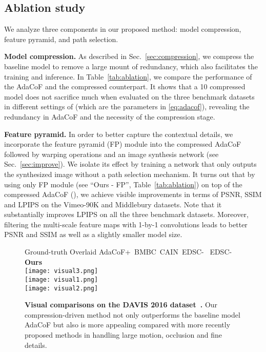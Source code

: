 \documentclass[final]{cvpr}
\newcommand{\myparagraph}[1]{\textbf{#1}}
\begin{document}
\subsection{Ablation study}

We analyze three components in our proposed method: model compression, feature pyramid, and path selection. 

\myparagraph{Model compression.} As described in Sec.~\ref{sec:compression}, we compress the baseline model to remove a large mount of redundancy, which also facilitates the training and inference. In Table~\ref{tab:ablation}, we compare the performance of the AdaCoF and the compressed counterpart. It shows that a 10 compressed model does not sacrifice much when evaluated on the three benchmark datasets in different settings of  (which are the parameters in \eqref{eq:adacof}), revealing the redundancy in AdaCoF and the necessity of the compression stage.


\myparagraph{Feature pyramid.} In order to better capture the contextual details, we incorporate the feature pyramid (FP) module into the compressed AdaCoF followed by warping operations and an image synthesis network (see Sec.~\ref{sec:improve}). We isolate its effect by training a network that only outputs the synthesized image without a path selection mechanism. It turns out that by using only FP module (see ``Ours - FP'', Table~\ref{tab:ablation}) on top of the compressed AdaCoF (), we achieve visible improvements in terms of PSNR, SSIM and LPIPS on the Vimeo-90K and Middlebury datasets. Note that it substantially improves LPIPS on all the three benchmark datasets. Moreover, filtering the multi-scale feature maps with 1-by-1 convolutions leads to better PSNR and SSIM as well as a slightly smaller model size.

\begin{figure*}[!ht]
\vspace{-.2in}
{\footnotesize \hspace{0.85in}Ground-truth\hspace{0.9in} Overlaid \hspace{0.12in}AdaCoF+~\cite{lee2020adacof}\hspace{0.04in}BMBC~\cite{park2020bmbc}\hspace{0.1in}CAIN~\cite{choi2020channel}\hspace{0.07in}EDSC-~\cite{cheng2020multiple}\hspace{0.0in} EDSC-~\cite{cheng2020multiple}\hspace{0.1in} \textbf{Ours}  } \\
    \centering
    \texttt{[image: visual3.png]}\\
    \texttt{[image: visual1.png]}\\
    \texttt{[image: visual2.png]}
    \caption{\textbf{Visual comparisons on the DAVIS 2016 dataset~\cite{perazzi2016}.} Our compression-driven method not only outperforms the baseline model AdaCoF but also is more appealing compared with more recently proposed methods in handling large motion, occlusion and fine details.}
    \label{fig:visual}
    \vspace{-.2in}
\end{figure*}
\end{document}
